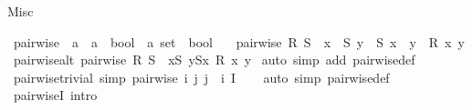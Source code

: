\begin{isabellebody}
\endisatagproof
{\isafoldproof}%
%
\isadelimproof
%
\endisadelimproof
\isanewline
\isanewline
{}\isamarkupfalse%
%
\begin{isamarkuptext}%
Misc%
\end{isamarkuptext}\isamarkuptrue%
\isamarkupfalse%
\ pairwise\ {\isacharcolon}{\kern0pt}{\isacharcolon}{\kern0pt}\ {\isachardoublequoteopen}{\isacharparenleft}{\kern0pt}{\isacharprime}{\kern0pt}a\ {\isasymRightarrow}\ {\isacharprime}{\kern0pt}a\ {\isasymRightarrow}\ bool{\isacharparenright}{\kern0pt}\ {\isasymRightarrow}\ {\isacharprime}{\kern0pt}a\ set\ {\isasymRightarrow}\ bool{\isachardoublequoteclose}\isanewline
\ \ \ {\isachardoublequoteopen}pairwise\ R\ S\ {\isasymlongleftrightarrow}\ {\isacharparenleft}{\kern0pt}{\isasymforall}x\ {\isasymin}\ S{\isachardot}{\kern0pt}\ {\isasymforall}y\ {\isasymin}\ S{\isachardot}{\kern0pt}\ x\ {\isasymnoteq}\ y\ {\isasymlongrightarrow}\ R\ x\ y{\isacharparenright}{\kern0pt}{\isachardoublequoteclose}\isanewline
\isanewline
{}\isamarkupfalse%
\ pairwise{\isacharunderscore}{\kern0pt}alt{\isacharcolon}{\kern0pt}\ {\isachardoublequoteopen}pairwise\ R\ S\ {\isasymlongleftrightarrow}\ {\isacharparenleft}{\kern0pt}{\isasymforall}x{\isasymin}S{\isachardot}{\kern0pt}\ {\isasymforall}y{\isasymin}S{\isacharminus}{\kern0pt}{\isacharbraceleft}{\kern0pt}x{\isacharbraceright}{\kern0pt}{\isachardot}{\kern0pt}\ R\ x\ y{\isacharparenright}{\kern0pt}{\isachardoublequoteclose}\isanewline
%
\isadelimproof
%
\endisadelimproof
%
\isatagproof
{}\isamarkupfalse%
\ {\isacharparenleft}{\kern0pt}auto\ simp\ add{\isacharcolon}{\kern0pt}\ pairwise{\isacharunderscore}{\kern0pt}def{\isacharparenright}{\kern0pt}%
\endisatagproof
{\isafoldproof}%
%
\isadelimproof
\isanewline
%
\endisadelimproof
\isanewline
{}\isamarkupfalse%
\ pairwise{\isacharunderscore}{\kern0pt}trivial\ {\isacharbrackleft}{\kern0pt}simp{\isacharbrackright}{\kern0pt}{\isacharcolon}{\kern0pt}\ {\isachardoublequoteopen}pairwise\ {\isacharparenleft}{\kern0pt}{\isasymlambda}i\ j{\isachardot}{\kern0pt}\ j\ {\isasymnoteq}\ i{\isacharparenright}{\kern0pt}\ I{\isachardoublequoteclose}\isanewline
%
\isadelimproof
\ \ %
\endisadelimproof
%
\isatagproof
{}\isamarkupfalse%
\ {\isacharparenleft}{\kern0pt}auto\ simp{\isacharcolon}{\kern0pt}\ pairwise{\isacharunderscore}{\kern0pt}def{\isacharparenright}{\kern0pt}%
\endisatagproof
{\isafoldproof}%
%
\isadelimproof
\isanewline
%
\endisadelimproof
\isanewline
{}\isamarkupfalse%
\ pairwiseI\ {\isacharbrackleft}{\kern0pt}intro{\isacharquery}{\kern0pt}{\isacharbrackright}{\kern0pt}{\isacharcolon}{\kern0pt}\isanewline

\end{isabellebody}
